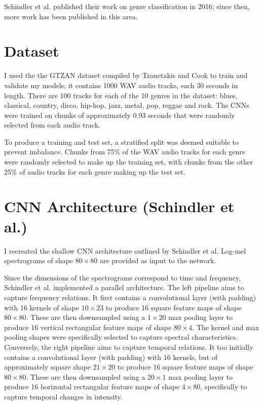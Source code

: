 \documentclass[conference]{IEEEtran}
\begin{document}
Schindler et al. published their work on genre classification in 2016; since then, more work has been published in this area.


\section{Dataset}

I used the the GTZAN dataset compiled by Tzanetakis and Cook \cite{TzanetakisCook} to train and validate my models; it contains 1000 WAV audio tracks, each 30 seconds in length.
There are 100 tracks for each of the 10 genres in the dataset: blues, classical, country, disco, hip-hop, jazz, metal, pop, reggae and rock.
The CNNs were trained on chunks of approximately 0.93 seconds that were randomly selected from each audio track.

To produce a training and test set, a stratified split was deemed suitable to prevent imbalance.
Chunks from 75\% of the WAV audio tracks for each genre were randomly selected to make up the training set, with chunks from the other 25\% of audio tracks for each genre making up the test set.

\section{CNN Architecture (Schindler et al.)}

I recreated the shallow CNN architecture outlined by Schindler et al.
Log-mel spectrograms of shape $80\times80$ are provided as input to the network.

Since the dimensions of the spectrograms correspond to time and frequency, Schindler et al. implemented a parallel architecture.
The left pipeline aims to capture frequency relations.
It first contains a convolutional layer (with padding) with 16 kernels of shape $10\times23$ to produce 16 square feature maps of shape $80\times80$.
These are then downsampled using a $1\times20$ max pooling layer to produce 16 vertical rectangular feature maps of shape $80\times4$.
The kernel and max pooling shapes were specifically selected to capture spectral characteristics.
Conversely, the right pipeline aims to capture temporal relations.
It too initially contains a convolutional layer (with padding) with 16 kernels, but of approximately square shape $21\times20$ to produce 16 square feature maps of shape $80\times80$.
These are then downsampled using a $20\times1$ max pooling layer to produce 16 horizontal rectangular feature maps of shape $4\times80$, specifically to capture temporal changes in intensity.
\end{document}
